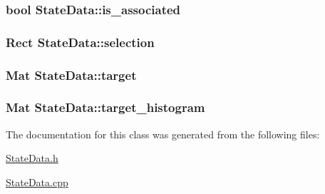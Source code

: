 \label{classStateData_a662c82a423f855845f2be8700af72817}
\hypertarget{classStateData_ad5f3d2a522bfdcff47e7d028bf19f012}{
\subsubsection[{is\_\-associated}]{\setlength{\rightskip}{0pt plus 5cm}bool {\bf StateData::is\_\-associated}}}
\label{classStateData_ad5f3d2a522bfdcff47e7d028bf19f012}
\hypertarget{classStateData_afea0bc5d1743e2db008238bfe9f574ce}{
\subsubsection[{selection}]{\setlength{\rightskip}{0pt plus 5cm}Rect {\bf StateData::selection}}}
\label{classStateData_afea0bc5d1743e2db008238bfe9f574ce}
\hypertarget{classStateData_ac778c44e62237a225361a80894a48ee8}{
\subsubsection[{target}]{\setlength{\rightskip}{0pt plus 5cm}Mat {\bf StateData::target}}}
\label{classStateData_ac778c44e62237a225361a80894a48ee8}
\hypertarget{classStateData_af93e02e6025c07b7a383b2e755f52dca}{
\subsubsection[{target\_\-histogram}]{\setlength{\rightskip}{0pt plus 5cm}Mat {\bf StateData::target\_\-histogram}}}
\label{classStateData_af93e02e6025c07b7a383b2e755f52dca}


The documentation for this class was generated from the following files:\begin{DoxyCompactItemize}
\item 
\hyperlink{StateData_8h}{StateData.h}\item 
\hyperlink{StateData_8cpp}{StateData.cpp}\end{DoxyCompactItemize}
